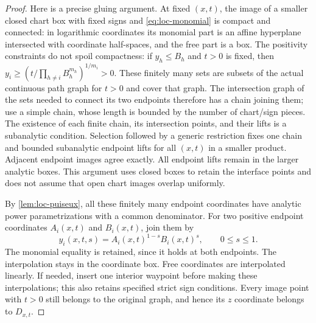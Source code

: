 \begin{proof}
Here is a precise gluing argument.  At fixed $(x,t)$, the image of a smaller closed chart box with fixed signs and \eqref{eq:loc-monomial} is compact and connected: in logarithmic coordinates its monomial part is an affine hyperplane intersected with coordinate half-spaces, and the free part is a box. The positivity constraints do not spoil compactness: if $y_h\leq B_h$ and $t>0$ is fixed, then $y_i\geq(t/\prod_{h\ne i}B_h^{m_h})^{1/m_i}>0$. These finitely many sets are subsets of the actual continuous path graph for $t>0$ and cover that graph.  The intersection graph of the sets needed to connect its two endpoints therefore has a chain joining them; use a simple chain, whose length is bounded by the number of chart/sign pieces.  The existence of each finite chain, its intersection points, and their lifts is a subanalytic condition.  Selection followed by a generic restriction fixes one chain and bounded subanalytic endpoint lifts for all $(x,t)$ in a smaller product.  Adjacent endpoint images agree exactly. All endpoint lifts remain in the larger analytic boxes.  This argument uses closed boxes to retain the interface points and does not assume that open chart images overlap uniformly.

By \cref{lem:loc-puiseux}, all these finitely many endpoint coordinates have analytic power parametrizations with a common denominator.  For two positive endpoint coordinates $A_i(x,t)$ and $B_i(x,t)$, join them by
\[
 y_i(x,t,s)=A_i(x,t)^{1-s}B_i(x,t)^s,
                   \qquad 0\leq s\leq1.
\]
The monomial equality is retained, since it holds at both endpoints. The interpolation stays in the coordinate box.  Free coordinates are interpolated linearly.  If needed, insert one interior waypoint before making these interpolations; this also retains specified strict sign conditions.  Every image point with $t>0$ still belongs to the original graph, and hence its $z$ coordinate belongs to $D_{x,t}$.


\end{proof}
